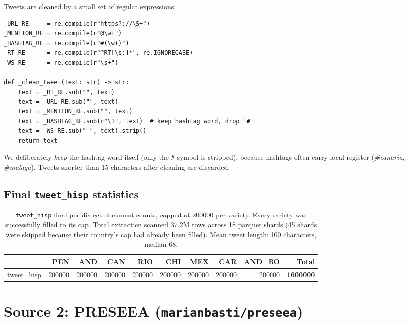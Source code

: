 \documentclass[11pt,a4paper]{article}
\begin{document}
Tweets are cleaned by a small set of regular expressions:

\begin{lstlisting}[style=pycode,caption={Tweet cleaning regex.}]
_URL_RE     = re.compile(r"https?://\S+")
_MENTION_RE = re.compile(r"@\w+")
_HASHTAG_RE = re.compile(r"#(\w+)")
_RT_RE      = re.compile(r"^RT[\s:]*", re.IGNORECASE)
_WS_RE      = re.compile(r"\s+")

def _clean_tweet(text: str) -> str:
    text = _RT_RE.sub("", text)
    text = _URL_RE.sub("", text)
    text = _MENTION_RE.sub("", text)
    text = _HASHTAG_RE.sub(r"\1", text)  # keep hashtag word, drop '#'
    text = _WS_RE.sub(" ", text).strip()
    return text
\end{lstlisting}

We deliberately \emph{keep} the hashtag word itself (only the \texttt{\#}
symbol is stripped), because hashtags often carry local register
(\emph{\#canaria}, \emph{\#malaga}). Tweets shorter than 15 characters
after cleaning are discarded.

\subsection{Final \texttt{tweet\_hisp} statistics}

\begin{table}[h]
\centering
\begin{tabular}{l r r r r r r r r r}
\toprule
 & \textbf{PEN} & \textbf{AND} & \textbf{CAN} & \textbf{RIO} & \textbf{CHI} & \textbf{MEX} & \textbf{CAR} & \textbf{AND\_BO} & \textbf{Total} \\
\midrule
tweet\_hisp & \num{200000} & \num{200000} & \num{200000} & \num{200000} & \num{200000} & \num{200000} & \num{200000} & \num{200000} & \textbf{\num{1600000}} \\
\bottomrule
\end{tabular}
\caption{\texttt{tweet\_hisp} final per-dialect document counts, capped
at \num{200000} per variety. Every variety was successfully filled to
its cap. Total extraction scanned 37.2M rows across 18 parquet shards
(45 shards were skipped because their country's cap had already been
filled). Mean tweet length: 100 characters, median 68.}
\label{tab:tweet-hisp-stats}
\end{table}

\section{Source 2: PRESEEA (\texttt{marianbasti/preseea})}
\end{document}
